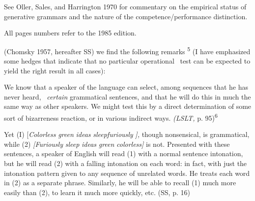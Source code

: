 \setcounter{listWWNumlxvleveli}{2}
\begin{listWWNumlxvleveli}
\item 
\begin{styleStandard}
See Oller, Sales, and Harrington 1970 for commentary on the empirical status of generative grammars and the nature of the competence/performance distinction.
\end{styleStandard}


\item 
\begin{styleStandard}
All pages numbers refer to the 1985 edition.
\end{styleStandard}


\end{listWWNumlxvleveli}
\clearpage\setcounter{page}{1}\begin{styleStandard}
(Chomsky 1957, hereafter SS) we find the following remarks \textsuperscript{5}\textsuperscript{ }(I have emphasized some hedges that indicate that no particular operational \ test can be expected to yield the right result in all cases):
\end{styleStandard}


\begin{styleStandard}
We know that a speaker of the language can select, among sequences that he has never heard, \ \textit{certain}\textit{ }grammatical sentences, and that he will do this in much the same way as other speakers. We might test this by a direct determination of some sort of {\textquotedbl}bizarreness reaction,{\textquotedbl} or in various indirect ways. \textit{(LSLT,}\textit{ }p. 95)\textsuperscript{6}
\end{styleStandard}


\begin{styleStandard}
Yet (I) [\textit{Colorless}\textit{ }\textit{green}\textit{ }\textit{ideas}\textit{ }\textit{sleep}\textit{furiously}\textit{ }\textit{],}\textit{ }though nonsensical, is grammatical, while (2) \textit{[Furiously}\textit{ }\textit{sleep}\textit{ }\textit{ideas}\textit{ }\textit{green}\textit{ }\textit{colorless}\textit{]}\textit{ }is not. Presented with these sentences, a speaker of English will read (1) with a normal sentence intonation, but he will read (2) with a falling intonation on each word: in fact, with just the intonation pattern given to any sequence of unrelated words. He treats each word in (2) as a separate phrase. Similarly, he will be able to recall (1) much more easily than (2), to learn it much more quickly, etc. (SS, p. 16)
\end{styleStandard}


